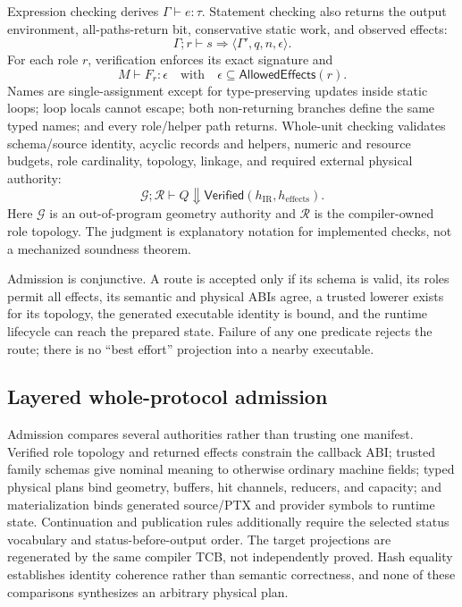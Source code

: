 \documentclass[sigplan,screen,review,anonymous]{acmart}
\begin{document}
Expression checking derives $\Gamma \vdash e : \tau$. Statement checking also
returns the output environment, all-paths-return bit, conservative static work,
and observed effects:
\begin{equation}
  \Gamma;r \vdash s \Rightarrow \langle \Gamma',q,n,\epsilon\rangle .
\end{equation}
For each role $r$, verification enforces its exact signature and
\begin{equation}
  M \vdash F_r : \epsilon
  \quad\text{with}\quad
  \epsilon \subseteq \mathsf{AllowedEffects}(r).
\end{equation}
Names are single-assignment except for type-preserving updates inside static
loops; loop locals cannot escape; both non-returning branches define the same
typed names; and every role/helper path returns. Whole-unit checking validates
schema/source identity, acyclic records and helpers, numeric and resource
budgets, role cardinality, topology, linkage, and required external physical
authority:
\begin{equation}
  \mathcal{G};\mathcal{R} \vdash Q \Downarrow
  \mathsf{Verified}(h_{\mathrm{IR}},h_{\mathrm{effects}}).
\end{equation}
Here $\mathcal{G}$ is an out-of-program geometry authority and $\mathcal{R}$ is
the compiler-owned role topology. The judgment is explanatory notation for
implemented checks, not a mechanized soundness theorem.

Admission is conjunctive. A route is accepted only if its schema is valid, its
roles permit all effects, its semantic and physical ABIs agree, a trusted
lowerer exists for its topology, the generated executable identity is bound,
and the runtime lifecycle can reach the prepared state. Failure of any one
predicate rejects the route; there is no ``best effort'' projection into a
nearby executable.

\subsection{Layered whole-protocol admission}

Admission compares several authorities rather than trusting one manifest.
Verified role topology and returned effects constrain the callback ABI; trusted
family schemas give nominal meaning to otherwise ordinary machine fields; typed
physical plans bind geometry, buffers, hit channels, reducers, and capacity;
and materialization binds generated source/PTX and provider symbols to runtime
state. Continuation and publication rules additionally require the selected
status vocabulary and status-before-output order. The target projections are
regenerated by the same compiler TCB, not independently proved. Hash equality
establishes identity coherence rather than semantic correctness, and none of
these comparisons synthesizes an arbitrary physical plan.
\end{document}
